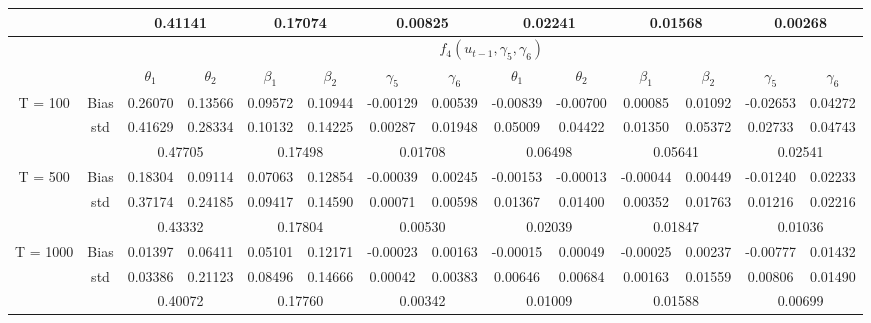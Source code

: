 \documentclass[a4paper,12pt,times,numbered,print,index]{report}
\numberwithin{equation}{section}
\begin{document}
\begin{table}[htbp]
\begin{adjustbox}{max width=\textwidth}
\begin{tabular}{cccccccccccccc}
		&       & \multicolumn{2}{c}{0.41141} & \multicolumn{2}{c}{0.17074} & \multicolumn{2}{c}{0.00825} & \multicolumn{2}{c}{0.02241} & \multicolumn{2}{c}{0.01568} & \multicolumn{2}{c}{0.00268} \\
		\midrule
		&       & \multicolumn{12}{c}{$f_4 (u_{t-1}, \gamma_5, \gamma_6)$} \\
		&       & $\theta_1$ & $\theta_2$ & $\beta_1$ & $\beta_2$ & $\gamma_5$ & $\gamma_{6}$ & $\theta_1$ & $\theta_2$ & $\beta_1$ & $\beta_2$ & $\gamma_5$ & $\gamma_{6}$ \\
		\midrule
		\multirow{3}[1]{*}{T = 100} & Bias  & 0.26070 & 0.13566 & 0.09572 & 0.10944 & -0.00129 & 0.00539 & -0.00839 & -0.00700 & 0.00085 & \textcolor[rgb]{ .329,  .51,  .208}{0.01092} & -0.02653 & 0.04272 \\
		& std   & 0.41629 & 0.28334 & 0.10132 & 0.14225 & 0.00287 & 0.01948 & 0.05009 & 0.04422 & 0.01350 & 0.05372 & 0.02733 & 0.04743 \\
		&       & \multicolumn{2}{c}{0.47705} & \multicolumn{2}{c}{0.17498} & \multicolumn{2}{c}{0.01708} & \multicolumn{2}{c}{0.06498} & \multicolumn{2}{c}{0.05641} & \multicolumn{2}{c}{0.02541} \\
		\multirow{3}[0]{*}{T = 500} & Bias  & 0.18304 & 0.09114 & 0.07063 & 0.12854 & -0.00039 & 0.00245 & -0.00153 & -0.00013 & -0.00044 & \textcolor[rgb]{ .329,  .51,  .208}{0.00449} & -0.01240 & 0.02233 \\
		& std   & 0.37174 & 0.24185 & 0.09417 & 0.14590 & 0.00071 & 0.00598 & 0.01367 & 0.01400 & 0.00352 & 0.01763 & 0.01216 & 0.02216 \\
		&       & \multicolumn{2}{c}{0.43332} & \multicolumn{2}{c}{0.17804} & \multicolumn{2}{c}{0.00530} & \multicolumn{2}{c}{0.02039} & \multicolumn{2}{c}{0.01847} & \multicolumn{2}{c}{0.01036} \\
		\multirow{3}[1]{*}{T = 1000} & Bias  & 0.01397 & 0.06411 & 0.05101 & 0.12171 & -0.00023 & 0.00163 & -0.00015 & 0.00049 & -0.00025 & \textcolor[rgb]{ .329,  .51,  .208}{0.00237} & -0.00777 & 0.01432 \\
		& std   & 0.03386 & 0.21123 & 0.08496 & 0.14666 & 0.00042 & 0.00383 & 0.00646 & 0.00684 & 0.00163 & 0.01559 & 0.00806 & 0.01490 \\
		&       & \multicolumn{2}{c}{0.40072} & \multicolumn{2}{c}{0.17760} & \multicolumn{2}{c}{0.00342} & \multicolumn{2}{c}{0.01009} & \multicolumn{2}{c}{0.01588} & \multicolumn{2}{c}{0.00699} \\
		\bottomrule
		\bottomrule
		\end{tabular}%
	\end{adjustbox}
	\label{nonco-f34}%
\end{table}%
\end{document}
